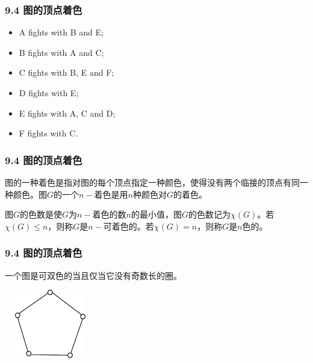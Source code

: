 \documentclass{beamer}
\begin{document}
\begin{CJK}{UTF8}{gbsn}
\begin{frame}
  \frametitle{9.4 图的顶点着色}
  \begin{itemize}
  \item A fights with B and E;
  \item B fights with A and C;
  \item C fights with B, E and F;
  \item D fights with E;
  \item E fights with A, C and D;
    \item F fights with C.
  \end{itemize}
\end{frame}
\begin{frame}
  \frametitle{9.4 图的顶点着色}
  \begin{definition9.4.1}
    图的一种着色是指对图的每个顶点指定一种颜色，使得没有两个临接的顶点有同一种颜色。图$G$的一个$n-$着色是用$n$种颜色对$G$的着色。
  \end{definition9.4.1}
  \begin{definition9.4.2}
    图$G$的色数是使$G$为$n-$着色的数$n$的最小值，图$G$的色数记为$\chi(G)$。若$\chi (G) \leq n$，则称$G$是$n-$可着色的。若$\chi (G) = n$，则称$G$是$n$色的。
  \end{definition9.4.2}
\end{frame}
\begin{frame}
  \frametitle{9.4 图的顶点着色}
  \begin{theorem9.4.1}
    一个图是可双色的当且仅当它没有奇数长的圈。
  \end{theorem9.4.1}
\vspace{1cm}
  \begin{minipage}{0.45\linewidth}
\includegraphics[width=4cm,height=3cm]{pentagon}    
  \end{minipage}
  \begin{minipage}{0.45\linewidth}
   
  \end{minipage}
\end{frame}


\end{CJK}
\end{document}
